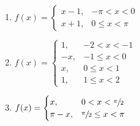 \begin{fullwidth}
\begin{enumerate}[resume]
\vspace{1.0cm}

\item $f(x) = 
\begin{cases}
x-1, & -\pi < x < 0 \\
x+1, & 0 \le x < \pi
\end{cases}$

\vspace{1.0cm}

\item $f(x) = 
\begin{cases}
1, & -2 < x < -1 \\
-x, & -1 \le x < 0 \\
x, & 0 \le x < 1 \\
1, & 1 \le x < 2
\end{cases}$

\vspace{1.0cm}

\item $f(x) = 
\begin{cases}
x, & 0 < x < \sfrac{\pi}{2} \\
\pi - x, & \sfrac{\pi}{2} \le x < \pi
\end{cases}$
\end{enumerate}

\end{fullwidth}
